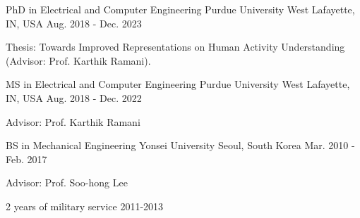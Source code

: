 


\begin{cventries}


    \cventry
    {PhD in Electrical and Computer Engineering} %
    {Purdue University} %
    {West Lafayette, IN, USA} %
    {Aug. 2018 - Dec. 2023} %
    { %
    \begin{cvitems}
        \item {Thesis: Towards Improved Representations on Human Activity Understanding (Advisor: Prof. Karthik Ramani).}
    \end{cvitems}
    }

    \cventry
    {MS in Electrical and Computer Engineering} %
    {Purdue University} %
    {West Lafayette, IN, USA} %
    {Aug. 2018 - Dec. 2022} %
    { %
    \begin{cvitems}
        \item {Advisor: Prof. Karthik Ramani}
    \end{cvitems}
    }

    \cventry
    {BS in Mechanical Engineering} %
    {Yonsei University} %
    {Seoul, South Korea} %
    {Mar. 2010 - Feb. 2017} %
    { %
    \begin{cvitems}
        \item {Advisor: Prof. Soo-hong Lee}
        \item {2 years of military service 2011-2013}
    \end{cvitems}
    }

\end{cventries}

